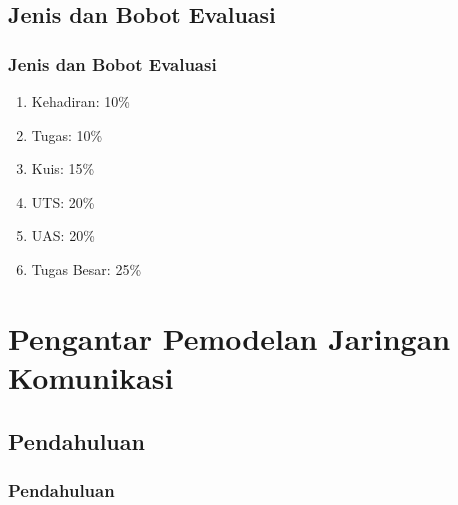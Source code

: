 \documentclass[pdflatex,compress]{beamer}
\begin{document}
\subsection{Jenis dan Bobot Evaluasi}

\begin{frame}
	\frametitle{Jenis dan Bobot Evaluasi}
	\begin{enumerate}
		\item Kehadiran: 10\%
		\item Tugas: 10\%
		\item Kuis: 15\%
		\item UTS: 20\%
		\item UAS: 20\%
		\item Tugas Besar: 25\%
	\end{enumerate}
\end{frame}

\section{Pengantar Pemodelan Jaringan Komunikasi}

\subsection{Pendahuluan}

\begin{frame}
	\frametitle{Pendahuluan}
\end{frame}
\end{document}
